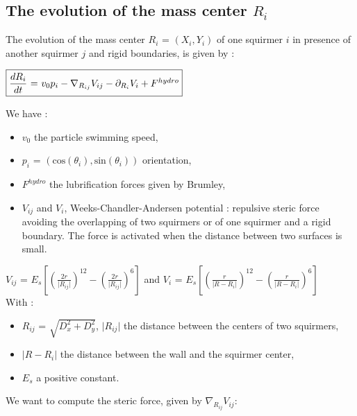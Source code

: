 \documentclass{article}
\begin{document}
\subsection{The evolution of the mass center $R_i$}
The evolution of the mass center $R_i$ = $(X_i, Y_i)$ of one squirmer $i$ in presence of 
another squirmer $j$ and rigid boundaries, is given by :
\begin{center}
$\boxed{\frac{dR_i}{dt}$ = $v_0 p_i -  \nabla_{R_{ij}} V_{ij} - \partial_{R_i} V_i + F^{hydro}}$
\end{center}
We have : \begin{itemize}
    \item $v_0$ the particle swimming speed,
    \item $p_i$ = $(\mathrm{cos}(\theta_i),\mathrm{sin}(\theta_i))$ orientation,
    \item $F^{hydro}$ the lubrification forces given by Brumley\cite{Brumley},
    \item $V_{ij}$ and $V_i$, Weeks-Chandler-Andersen potential : repulsive steric force avoiding the overlapping of two squirmers or of one squirmer and a rigid boundary. The force is activated when the distance between two surfaces is small.
\end{itemize} 
\vspace{0,5cm}
$V_{ij}$ = $E_s\left[\left(\frac{2r}{\lvert R_{ij}\rvert}\right)^{12} - \left(\frac{2r}{\lvert R_{ij}\rvert}\right)^6\right]$ and  $V_i$ = $E_s \left[ \left( \frac{r}{\lvert R - R_i \rvert} \right)^{12} - \left( \frac{r}{\lvert R - R_i \rvert} \right) ^6 \right]$ 
\vspace{0,3cm}
\\With : \begin{itemize}
    \item $R_{ij}$ = $\sqrt{D_x^2+D_y^2}$, $\lvert R_{ij} \rvert$ the distance between the centers of two squirmers,
    \item $\lvert R - R_i\rvert$ the distance between the wall and the squirmer center,
    \item $E_s$ a positive constant.
\end{itemize}

\vspace{0,5cm}
We want to compute the steric force, given by $\nabla_{R_{ij}} V_{ij}$:
\end{document}
